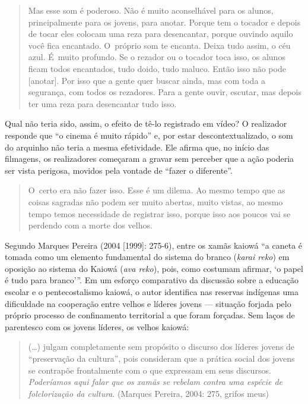 \begin{quote}
Mas esse som é poderoso. Não é muito aconselhável para os alunos,
principalmente para os jovens, para anotar. Porque tem o tocador e
depois de tocar eles colocam uma reza para desencantar, porque ouvindo
aquilo você fica encantado. O~próprio som te encanta. Deixa tudo assim,
o céu azul. É~muito profundo. Se o rezador ou o tocador toca isso, os
alunos ficam todos encantados, tudo doido, tudo maluco. Então isso não
pode [anotar]. Por isso que a gente quer buscar ainda, mas com toda a
segurança, com todos os rezadores. Para a gente ouvir, escutar, mas
depois ter uma reza para desencantar tudo isso.
\end{quote}

Qual não teria sido, assim, o efeito de tê-lo registrado em vídeo? O
realizador responde que ``o cinema é muito rápido'' e, por estar
descontextualizado, o som do arquinho não teria a mesma efetividade.
Ele afirma que, no início das filmagens, os realizadores começaram a
gravar sem perceber que a ação poderia ser vista perigosa, movidos pela
vontade de ``fazer o diferente''.

\begin{quote}
O~certo era não fazer isso. Esse é um dilema. Ao mesmo tempo que as
coisas sagradas não podem ser muito abertas, muito vistas, ao mesmo
tempo temos necessidade de registrar isso, porque isso aos poucos vai
se perdendo com a morte dos velhos.
\end{quote}

Segundo Marques Pereira (2004 [1999]: 275-6), entre os xamãs kaiowá ``a
caneta é tomada como um elemento fundamental do sistema do branco
(\emph{karai reko}) em oposição ao sistema do Kaiowá (\emph{ava reko}), pois, como
costumam afirmar, ‘o papel é tudo para branco’''. Em um esforço
comparativo da discussão sobre a educação escolar e o pentecostalismo
kaiowá, o autor identifica nas reservas indígenas uma dificuldade na
cooperação entre velhos e líderes jovens --- situação forjada pelo
próprio processo de confinamento territorial a que foram forçadas. Sem
laços de parentesco com os jovens líderes, os velhos kaiowá:

\begin{quote}
(\ldots{}) julgam completamente sem propósito o discurso dos líderes jovens
de ``preservação da cultura'', pois
consideram que a prática social dos jovens se contrapõe frontalmente
com o que expressam em seus discursos. \emph{Poderíamos aqui falar que os
xamãs se rebelam contra uma espécie de folclorização da cultura}.
(Marques Pereira, 2004: 275, grifos meus)
\end{quote}


